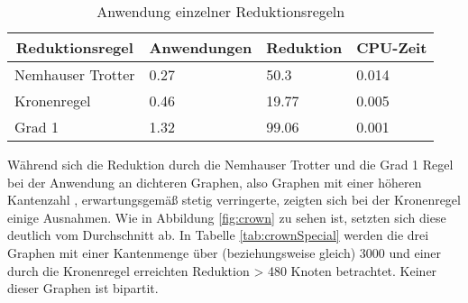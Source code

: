 \begin{table}[htb]
\caption{Anwendung einzelner Reduktionsregeln\label{tab:anwendung}}
\vspace*{1em}
\centering

\bgroup
\def\arraystretch{1.3}%


\begin{tabular}[c]{l|l|l|l}
	
	\multicolumn{1}{c|}{\textbf{Reduktionsregel}} & 
	\multicolumn{1}{c|}{\textbf{Anwendungen}} & 
	\multicolumn{1}{c|}{\textbf{Reduktion}} & 
	\multicolumn{1}{c}{\textbf{CPU-Zeit}} \\ 
	
	\hline

	Nemhauser Trotter& 0.27 &  50.3 & 0.014\\
	Kronenregel& 0.46 & 19.77 & 0.005\\
	Grad 1&1.32 & 99.06 & 0.001\\
	
\end{tabular}

\egroup

\end{table}
Während sich die Reduktion durch die Nemhauser Trotter und die Grad 1 Regel bei der Anwendung an dichteren Graphen, also Graphen mit einer höheren Kantenzahl \cite{dummy}, erwartungsgemäß stetig verringerte, zeigten sich bei der Kronenregel einige Ausnahmen. Wie in Abbildung \ref{fig:crown} zu sehen ist, setzten sich diese deutlich vom Durchschnitt ab. In Tabelle \ref{tab:crownSpecial} werden die drei Graphen mit einer Kantenmenge über (beziehungsweise gleich) 3000 und einer durch die Kronenregel erreichten Reduktion > 480 Knoten betrachtet. Keiner dieser Graphen ist bipartit.
